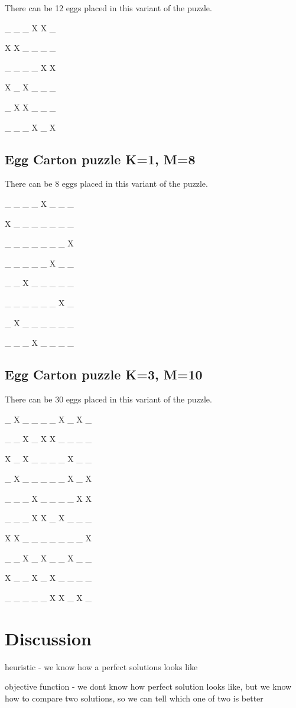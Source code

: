 \documentclass{article}
\begin{document}
There can be 12 eggs placed in this variant of the puzzle.

\_ \_ \_ X X \_ 

X X \_ \_ \_ \_ 

\_ \_ \_ \_ X X 

X \_ X \_ \_ \_ 

\_ X X \_ \_ \_ 

\_ \_ \_ X \_ X 

\subsection{Egg Carton puzzle K=1, M=8}

There can be 8 eggs placed in this variant of the puzzle.

\_ \_ \_ \_ X \_ \_ \_ 

X \_ \_ \_ \_ \_ \_ \_ 

\_ \_ \_ \_ \_ \_ \_ X 

\_ \_ \_ \_ \_ X \_ \_ 

\_ \_ X \_ \_ \_ \_ \_ 

\_ \_ \_ \_ \_ \_ X \_ 

\_ X \_ \_ \_ \_ \_ \_ 

\_ \_ \_ X \_ \_ \_ \_ 

\subsection{Egg Carton puzzle K=3, M=10}

There can be 30 eggs placed in this variant of the puzzle. 

\_ X \_ \_ \_ \_ X \_ X \_ 

\_ \_ X \_ X X \_ \_ \_ \_ 

X \_ X \_ \_ \_ \_ X \_ \_ 

\_ X \_ \_ \_ \_ \_ X \_ X 

\_ \_ \_ X \_ \_ \_ \_ X X 

\_ \_ \_ X X \_ X \_ \_ \_ 

X X \_ \_ \_ \_ \_ \_ \_ X 

\_ \_ X \_ X \_ \_ X \_ \_ 

X \_ \_ X \_ X \_ \_ \_ \_ 

\_ \_ \_ \_ \_ X X \_ X \_ 

\section{Discussion}

heuristic - we know how a perfect solutions looks like

objective function - we dont know how perfect solution looks like, but we know
how to compare two solutions, so we can tell which one of two is better
\end{document}
